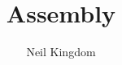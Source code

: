 \documentclass{article}
\begin{document}
\renewcommand\maketitlehooka{\vfill}
\renewcommand\maketitlehookd{\vfill}

\begin{titlingpage}
    \title{Assembly}
    \author{Neil Kingdom}
    \maketitle
\end{titlingpage}

\newpage

\tableofcontents

\newpage
\end{document}
